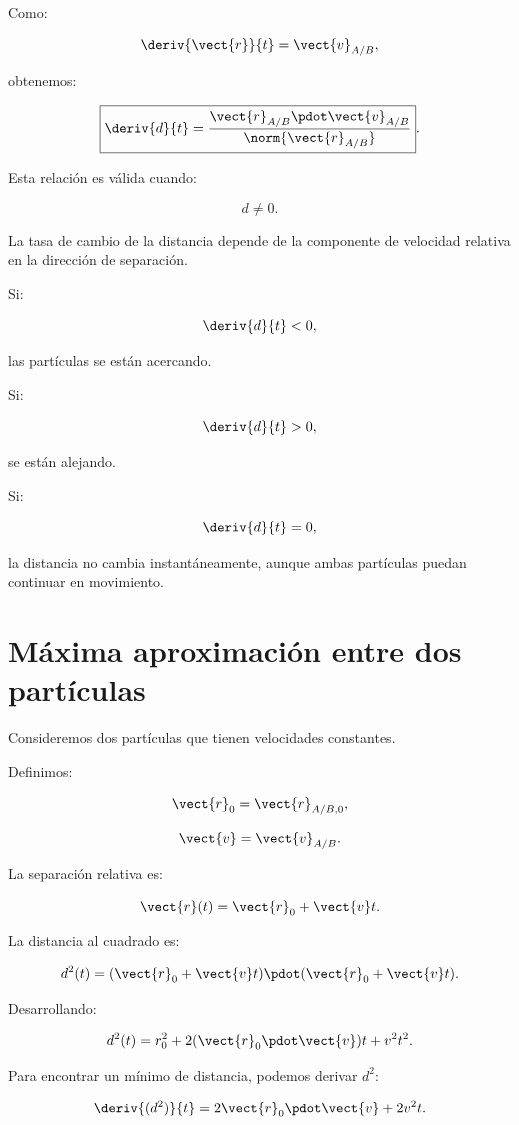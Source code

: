 Como:

\[
\deriv{\vect{r}}{t}
=
\vect{v}_{A/B},
\]

obtenemos:

\[
\boxed{
\deriv{d}{t}
=
\frac{
\vect{r}_{A/B}\pdot\vect{v}_{A/B}
}{
\norm{\vect{r}_{A/B}}
}
}.
\]

Esta relación es válida cuando:

\[
d\neq0.
\]

\begin{interpretacion}

La tasa de cambio de la distancia depende
de la componente de velocidad relativa
en la dirección de separación.

Si:

\[
\deriv{d}{t}<0,
\]

las partículas se están acercando.

Si:

\[
\deriv{d}{t}>0,
\]

se están alejando.

Si:

\[
\deriv{d}{t}=0,
\]

la distancia no cambia instantáneamente,
aunque ambas partículas puedan continuar
en movimiento.

\end{interpretacion}


\section{Máxima aproximación entre dos partículas}

Consideremos dos partículas que tienen
velocidades constantes.

Definimos:

\[
\vect{r}_0=\vect{r}_{A/B,0},
\]

\[
\vect{v}=\vect{v}_{A/B}.
\]

La separación relativa es:

\[
\vect{r}(t)=\vect{r}_0+\vect{v}t.
\]

La distancia al cuadrado es:

\[
d^2(t)
=
(\vect{r}_0+\vect{v}t)
\pdot
(\vect{r}_0+\vect{v}t).
\]

Desarrollando:

\[
d^2(t)
=
r_0^2
+
2(\vect{r}_0\pdot\vect{v})t
+
v^2t^2.
\]

Para encontrar un mínimo de distancia,
podemos derivar \(d^2\):

\[
\deriv{(d^2)}{t}
=
2\vect{r}_0\pdot\vect{v}
+
2v^2t.
\]

